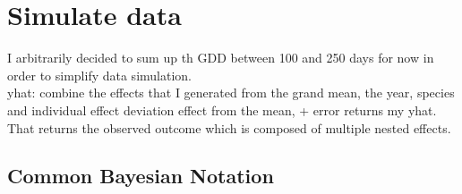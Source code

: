 \documentclass[a4paper,12pt]{article}
\begin{document}
\section{Simulate data}
I arbitrarily decided to sum up th GDD between 100 and 250 days for now in order to simplify data simulation. \\
yhat: combine the effects that I generated from the grand mean, the year, species and individual effect deviation effect from the mean, + error returns my yhat. That returns the observed outcome which is composed of multiple nested effects. 

\subsection*{Common Bayesian Notation} %
\end{document}
